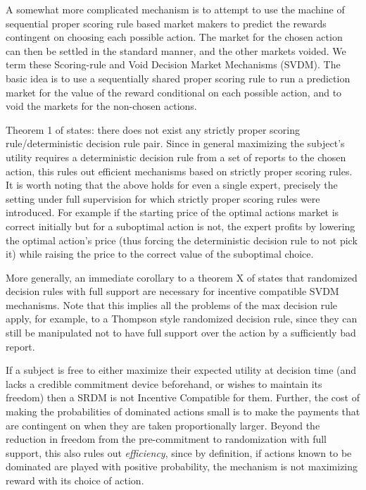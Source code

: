 
A somewhat more complicated mechanism is to attempt to use the machine of sequential proper scoring rule based market makers to predict the rewards contingent on choosing each possible action. The market for the chosen action can then be settled in the standard manner, and the other markets voided. 
We term these Scoring-rule and Void Decision Market Mechanisms (SVDM). The basic idea is to use a sequentially shared proper scoring rule to run a prediction market for the value of the reward conditional on each possible action, and to void the markets for the non-chosen actions.  

Theorem 1 of \cite{othman2010decision} states: there does not exist any strictly proper scoring rule/deterministic decision rule pair.
Since in general maximizing the subject's utility requires a deterministic decision rule from a set of reports to the chosen action, this rules out efficient mechanisms based on strictly proper scoring rules. 
It is worth noting that the above holds for even a single expert, precisely the setting under full supervision for which strictly proper scoring rules were introduced. 
For example if the starting price of the optimal actions market is correct initially but for a suboptimal action is not, the expert profits by lowering the optimal action's price (thus forcing the deterministic decision rule to not pick it) while raising the price to the correct value of the suboptimal choice. 

More generally, an immediate corollary to a theorem X of \cite{chen2014eliciting} states that randomized decision rules with full support are necessary for incentive compatible SVDM mechanisms.
Note that this implies all the problems of the max decision rule apply, for example, to a Thompson style randomized decision rule, since they can still be manipulated not to have full support over the action by a sufficiently bad report.

If a subject is free to either maximize their expected utility at decision time (and lacks a credible commitment device beforehand, or wishes to maintain its freedom) then a SRDM is not Incentive Compatible for them. Further, the cost of making the probabilities of dominated actions small is to make the payments that are contingent on when they are taken proportionally larger.
Beyond the reduction in freedom from the pre-commitment to randomization with full support, this also rules out \emph{efficiency}, since by definition, if actions known to be dominated are played with positive probability, the mechanism is not maximizing reward with its choice of action.
 
